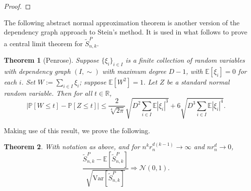 \documentclass{amsart}
\newtheorem{thm}{Theorem}[section]
\theoremstyle{definition}
\newcommand{\R}{\mathbb{R}}
\newcommand{\E}{\mathbb{E}}
\newcommand{\X}{\mathcal{X}}
\renewcommand{\P}{\mathbb{P}}
\newcommand{\var}{\mathrm{Var}}
\newcommand{\s}{\widetilde{S}}
\renewcommand{\1}{\mathbb{1}}
\begin{document}
\begin{proof}
\begin{comment}
Next, let $\eta_{12}$ be the indicator that no edges connect 
$\X_k'$ to $\X_{2k}'\setminus\X_k'$.  Then
\begin{equation*}\begin{split}
\P\left[\eta_2=1\big|\xi_1=\xi_2=1\right]&=\P\left[\eta_2=1\big|\xi_1=\xi_2=1,
\eta_{12}=1\right]\P\left[\eta_{12}=1\big|\xi_1=\xi_2=1\right].
\end{split}\end{equation*}
Similarly to the argument above,
$$\P\left[\eta_2=1\big|\xi_1=\xi_2=1,
\eta_{12}=1\right]\ge e^{-n\|f\|_\infty\theta_d(4r_n)^d},$$
and 
$$\P\left[\eta_{12}=1\big|\xi_1=\xi_2=1\right]\ge\P\left[|X_1-X_k|\ge 8r_n
\big|\xi_1=\xi_2=1\right]\ge
1-\frac{\|f\|_\infty^k\theta_d^k(2^{k+2}r_n)^d}{\mu_A}.$$

Finally, $\P[\xi_1=\xi_2=1]=\left(\P[\xi_1=1]\right)^2\simeq
r_n^{2d(k-1)}\mu_A^2,$ by independence of the points of $\X_{2k}'$.  
All together, this shows that 
$$\E[\xi_1\xi_2\eta_1\eta_2]\simeq r_n^{2d(k-1)}\mu_A^2,$$
and so 
\begin{equation*}
\var\left[\s_{n,k,A}^P\right]
\simeq\frac{n^kr_n^{
d(k-1)}\mu_A}{k!}.
\end{equation*}
\end{comment}
\end{proof}

The following abstract normal approximation theorem is another version
of the dependency graph approach to Stein's method.  It is used in what
follows to prove a central limit theorem for $\s_{n,k}^P$.

\begin{thm}[Penrose]\label{normal}
Suppose $\{\xi_i\}_{i\in I}$ is a finite collection of random variables with
dependency graph $(I,\sim)$ with maximum degree $D-1$, with $\E[\xi_i]=0$
for each $i$.  Set $W:=\sum_{i\in I}\xi_i$; suppose $\E[W^2]=1$.  Let $Z$
be a standard normal random variable.  Then for all $t\in\R$,
$$\big|\P[W\le t]-\P[Z\le t]\big|\le\frac{2}{\sqrt[4]{2\pi}}\sqrt{D^2\sum_{
i\in I}\E|\xi_i|^3}+6\sqrt{D^3\sum_{i\in I}\E|\xi_i|^4}.$$
\end{thm}

Making use of this result, we prove the following.

\begin{thm}\label{Poissonized_normal}
With notation as above, and for $n^kr_n^{d(k-1)}\to\infty$ and $nr_n^d\to0$,
$$\frac{\s_{n,k}^P-\E\left[\s_{n,k}^P\right]}{\sqrt{\var\left[\s_{n,k}^P\right]}}
\Rightarrow\mathcal{N}(0,1).$$
\end{thm}
\end{document}
